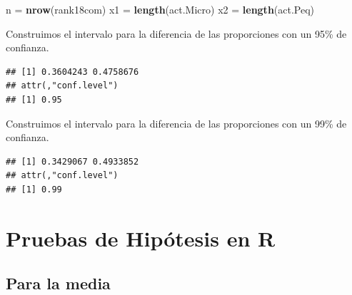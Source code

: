 \documentclass[letterpaper,]{book}
\newenvironment{Shaded}{\begin{snugshade}}{\end{snugshade}}
\newcommand{\DataTypeTok}[1]{\textcolor[rgb]{0.13,0.29,0.53}{#1}}
\newcommand{\FloatTok}[1]{\textcolor[rgb]{0.00,0.00,0.81}{#1}}
\newcommand{\KeywordTok}[1]{\textcolor[rgb]{0.13,0.29,0.53}{\textbf{#1}}}
\newcommand{\NormalTok}[1]{#1}
\newcommand{\OperatorTok}[1]{\textcolor[rgb]{0.81,0.36,0.00}{\textbf{#1}}}
\newcommand{\StringTok}[1]{\textcolor[rgb]{0.31,0.60,0.02}{#1}}
\begin{document}
\begin{Shaded}
\begin{Highlighting}[]
\NormalTok{n =}\StringTok{ }\KeywordTok{nrow}\NormalTok{(rank18com)}
\NormalTok{x1 =}\StringTok{ }\KeywordTok{length}\NormalTok{(act.Micro)}
\NormalTok{x2 =}\StringTok{ }\KeywordTok{length}\NormalTok{(act.Peq)}
\end{Highlighting}
\end{Shaded}

Construimos el intervalo para la diferencia de las proporciones con un 95\% de confianza.

\begin{Shaded}
\end{Shaded}

\begin{verbatim}
## [1] 0.3604243 0.4758676
## attr(,"conf.level")
## [1] 0.95
\end{verbatim}

Construimos el intervalo para la diferencia de las proporciones con un 99\% de confianza.

\begin{Shaded}
\end{Shaded}

\begin{verbatim}
## [1] 0.3429067 0.4933852
## attr(,"conf.level")
## [1] 0.99
\end{verbatim}

\hypertarget{pruebas-de-hipotesis-en-r}{%
\section{Pruebas de Hipótesis en R}\label{pruebas-de-hipotesis-en-r}}

\hypertarget{para-la-media-1}{%
\subsection{Para la media}\label{para-la-media-1}}
\end{document}
